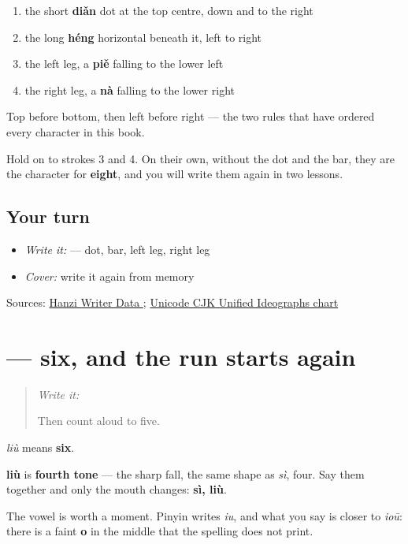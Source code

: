 \begin{enumerate}
\raggedright
  \item the short \textbf{diǎn} dot at the top centre, down and to the right
  \item the long \textbf{héng} horizontal beneath it, left to right
  \item the left leg, a \textbf{piě} falling to the lower left
  \item the right leg, a \textbf{nà} falling to the lower right
\end{enumerate}

Top before bottom, then left before right — the two rules that have ordered every character in this book.

Hold on to strokes 3 and 4. On their own, without the dot and the bar, they are the character for \textbf{eight}, and you will write them again in two lessons.

\subsection*{Your turn}
\begin{itemize}
\raggedright
  \item \emph{Write it:}  — dot, bar, left leg, right leg
  \item \emph{Cover:} write it again from memory
\end{itemize}

\begin{tcolorbox}[breakable,colback=teal!4,colframe=teal!35!black,title={Before you move on}]
Sources: \href{https://raw.githubusercontent.com/chanind/hanzi-writer-data/68d10a4b21150cae5e1ebbd223eed289cf32d90c/data/\%E5\%85\%AD.json}{Hanzi Writer Data }; \href{https://www.unicode.org/charts/PDF/U4E00.pdf}{Unicode CJK Unified Ideographs chart}
\end{tcolorbox}
\section[\texorpdfstring{\zh{六} (liù)}{六 (liù)}]{ — six, and the run starts again}

\label{lesson:ZH-C20-liu}



\begin{quote}
\emph{Write it:} 

Then count aloud to five.
\end{quote}

\begin{sounds}
\textbf{} \emph{liù} means \textbf{six}.

\textbf{liù} is \textbf{fourth tone} — the sharp fall, the same shape as \emph{sì}, four. Say them together and only the mouth changes: \textbf{sì, liù}.

The vowel is worth a moment. Pinyin writes \emph{iu}, and what you say is closer to \emph{ioū}: there is a faint \textbf{o} in the middle that the spelling does not print.
\end{sounds}

